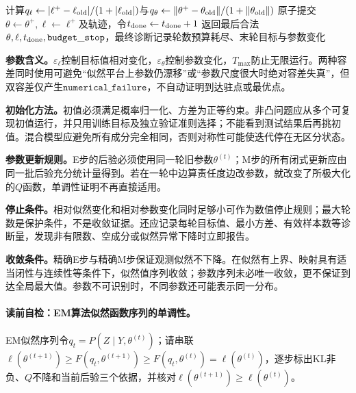 \begin{AlgorithmContract}
\begin{algorithm}[H]
{  计算$q_\ell\leftarrow|\ell^+-\ell_{\rm old}|/(1+|\ell_{\rm old}|)$与$q_\theta\leftarrow\|\theta^+-\theta_{\rm old}\|/(1+\|\theta_{\rm old}\|)$\;
  原子提交$\theta\leftarrow\theta^+,\ell\leftarrow\ell^+$及轨迹，令$t_{\rm done}\leftarrow t_{\rm done}+1$\;
}
返回最后合法$\theta,\ell,t_{\rm done},\mathtt{budget\_stop}$，最终诊断记录轮数预算耗尽、末轮目标与参数变化\;
\end{algorithm}
\end{AlgorithmContract}

\label{struct:V3-C04-CH21}
\textbf{参数含义。}$\varepsilon_{\ell}$控制目标值相对变化，$\varepsilon_{\theta}$控制参数变化，$T_{\max}$防止无限运行。两种容差同时使用可避免“似然平台上参数仍漂移”或“参数尺度很大时绝对容差失真”，但双容差仅产生$\mathtt{numerical\_failure}$，不自动证明到达驻点或最优点。

\label{struct:V3-C04-CH22}
\textbf{初始化方法。}初值必须满足概率归一化、方差为正等约束。非凸问题应从多个可复现初值运行，并只用训练目标及独立验证准则选择；不能看到测试结果后再挑初值。混合模型应避免所有成分完全相同，否则对称性可能使迭代停在无区分状态。

\label{struct:V3-C04-CH23}
\textbf{参数更新规则。}E步的后验必须使用同一轮旧参数$\theta^{(t)}$；M步的所有闭式更新应由同一批后验充分统计量得到。若在一轮中边算责任度边改参数，就改变了所极大化的$Q$函数，单调性证明不再直接适用。

\label{struct:V3-C04-CH24}
\textbf{停止条件。}相对似然变化和相对参数变化同时足够小可作为数值停止规则；最大轮数是保护条件，不是收敛证据。还应记录每轮目标值、最小方差、有效样本数等诊断量，发现非有限数、空成分或似然异常下降时立即报告。

\label{struct:V3-C04-CH25}
\textbf{收敛条件。}精确E步与精确M步保证观测似然不下降。在似然有上界、映射具有适当闭性与连续性等条件下，似然值序列收敛；参数序列未必唯一收敛，更不保证到达全局最大值。参数不可识别时，不同参数还可能表示同一分布。


\paragraph{读前自检：EM算法似然函数序列的单调性。}EM似然序列令$q_t=P(Z\mid Y,\theta^{(t)})$；请串联$\ell(\theta^{(t+1)})\ge F(q_t,\theta^{(t+1)})\ge F(q_t,\theta^{(t)})=\ell(\theta^{(t)})$，逐步标出KL非负、$Q$不降和当前后验三个依据，并核对$\ell(\theta^{(t+1)})\ge\ell(\theta^{(t)})$。\par

